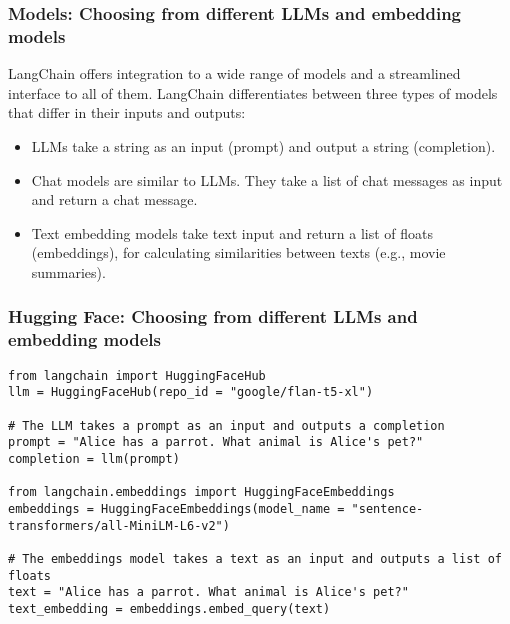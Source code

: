\begin{frame}[fragile]\frametitle{Models: Choosing from different LLMs and embedding models}

LangChain offers integration to a wide range of models and a streamlined interface to all of them. LangChain differentiates between three types of models that differ in their inputs and outputs:

\begin{itemize}
\item LLMs take a string as an input (prompt) and output a string (completion).
\item Chat models are similar to LLMs. They take a list of chat messages as input and return a chat message.
\item Text embedding models take text input and return a list of floats (embeddings), for calculating similarities between texts (e.g., movie summaries).
\end{itemize}

\end{frame}

\begin{frame}[fragile]\frametitle{Hugging Face: Choosing from different LLMs and embedding models}

\begin{lstlisting}
from langchain import HuggingFaceHub
llm = HuggingFaceHub(repo_id = "google/flan-t5-xl")

# The LLM takes a prompt as an input and outputs a completion
prompt = "Alice has a parrot. What animal is Alice's pet?"
completion = llm(prompt)

from langchain.embeddings import HuggingFaceEmbeddings
embeddings = HuggingFaceEmbeddings(model_name = "sentence-transformers/all-MiniLM-L6-v2")

# The embeddings model takes a text as an input and outputs a list of floats
text = "Alice has a parrot. What animal is Alice's pet?"
text_embedding = embeddings.embed_query(text)


\end{lstlisting}


\end{frame}


